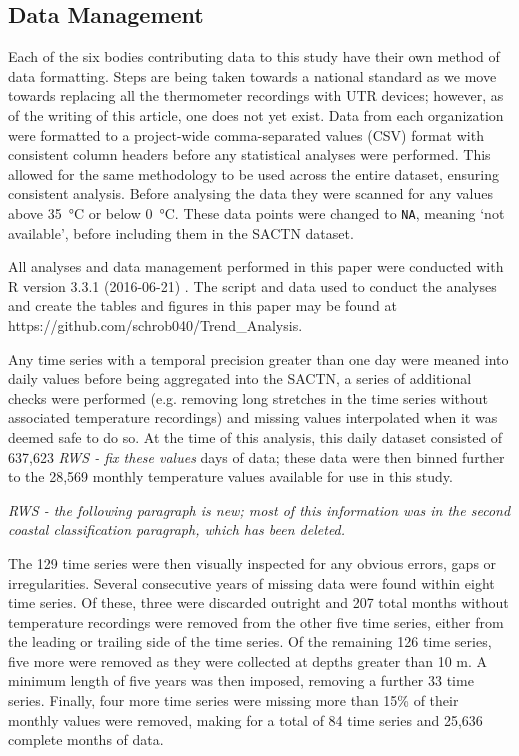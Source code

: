 \documentclass{ametsoc}
\begin{document}
\subsection{Data Management}
Each of the six bodies contributing data to this study have their own method of data formatting. Steps are being taken towards a national standard as we move towards replacing all the thermometer recordings with UTR devices; however, as of the writing of this article, one does not yet exist. Data from each organization were formatted to a project-wide comma-separated values (CSV) format with consistent column headers before any statistical analyses were performed. This allowed for the same methodology to be used across the entire dataset, ensuring consistent analysis. Before analysing the data they were scanned for any values above \SI{35}{\degreeCelsius} or below \SI{0}{\degreeCelsius}. These data points were changed to \texttt{NA}, meaning `not available', before including them in the SACTN dataset.

All analyses and data management performed in this paper were conducted with R version 3.3.1 (2016-06-21) \citep{R}. The script and data used to conduct the analyses and create the tables and figures in this paper may be found at https://github.com/schrob040/Trend_Analysis.

Any time series with a temporal precision greater than one day were meaned into daily values before being aggregated into the SACTN, a series of additional checks were performed (e.g. removing long stretches in the time series without associated temperature recordings) and missing values interpolated when it was deemed safe to do so. At the time of this analysis, this daily dataset consisted of 637,623 \emph{RWS - fix these values} days of data; these data were then binned further to the 28,569 monthly temperature values available for use in this study.

\emph{RWS - the following paragraph is new; most of this information was in the second coastal classification paragraph, which has been deleted.}

The 129 time series were then visually inspected for any obvious errors, gaps or irregularities. Several consecutive years of missing data were found within eight time series. Of these, three were discarded outright and 207 total months without temperature recordings were removed from the other five time series, either from the leading or trailing side of the time series. Of the remaining 126 time series, five more were removed as they were collected at depths greater than 10 m. A minimum length of five years was then imposed, removing a further 33 time series. Finally, four more time series were missing more than 15\% of their monthly values were removed, making for a total of 84 time series and 25,636 complete months of data.
\end{document}
